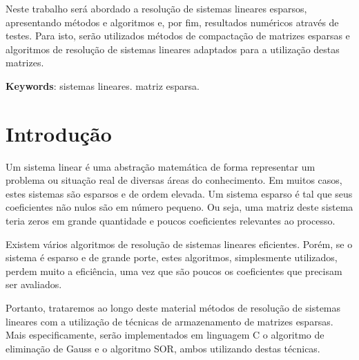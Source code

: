 \documentclass[
	article,			%
	11pt,				%
	oneside,			%
	a4paper,			%
	english,			%
	brazil,				%
	sumario=tradicional
	]{abntex2}
\date{11 de Outubro, 2015}
\begin{document}

\frenchspacing 


\maketitle

\begin{resumoumacoluna}
Neste trabalho será abordado a resolução de sistemas lineares esparsos, apresentando métodos e algoritmos e, por fim, resultados numéricos através de testes. Para isto, serão utilizados métodos de compactação de matrizes esparsas e algoritmos de resolução de sistemas lineares adaptados para a utilização destas matrizes.

\textbf{Keywords}: sistemas lineares. matriz esparsa.
\end{resumoumacoluna}

\textual

\section*{Introdução}

Um sistema linear é uma abstração matemática de forma representar um problema ou situação real de diversas áreas do conhecimento. Em muitos casos, estes sistemas são esparsos e de ordem elevada. Um sistema esparso é tal que seus coeficientes não nulos são em número pequeno. Ou seja, uma matriz deste sistema teria zeros em grande quantidade e poucos coeficientes relevantes ao processo. \cite{sparse}

Existem vários algoritmos de resolução de sistemas lineares eficientes. Porém, se o sistema é esparso e de grande porte, estes algoritmos, simplesmente utilizados, perdem muito a eficiência, uma vez que são poucos os coeficientes que precisam ser avaliados.

Portanto, trataremos ao longo deste material métodos de resolução de sistemas lineares com a utilização de técnicas de armazenamento de matrizes esparsas. Mais especificamente, serão implementados em linguagem C o algoritmo de eliminação de Gauss e o algoritmo SOR, ambos utilizando destas técnicas.
\end{document}
